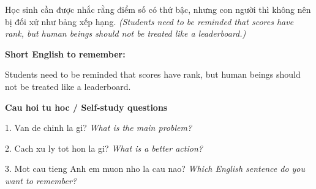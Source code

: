 \begin{baihoc}
Học sinh cần được nhắc rằng điểm số có thứ bậc, nhưng con người thì không nên bị đối xử như bảng xếp hạng.
\textit{(Students need to be reminded that scores have rank, but human beings should not be treated like a leaderboard.)}
\end{baihoc}

\begin{ghinhoanh}
\textbf{Short English to remember:}

Students need to be reminded that scores have rank, but human beings should not be treated like a leaderboard.

\end{ghinhoanh}

\begin{tuhocnhanh}
\textbf{Cau hoi tu hoc / Self-study questions}

1. Van de chinh la gi? \textit{What is the main problem?}

2. Cach xu ly tot hon la gi? \textit{What is a better action?}

3. Mot cau tieng Anh em muon nho la cau nao? \textit{Which English sentence do you want to remember?}
\end{tuhocnhanh}
